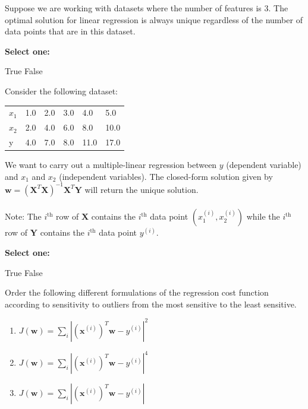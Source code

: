 \documentclass[11pt,addpoints,answers]{exam}
\numberwithin{equation}{section} %
\numberwithin{figure}{section} %
\numberwithin{table}{section} %
\newcommand{\wv}{\mathbf{w}}
\newcommand{\xv}{\mathbf{x}}
\newcommand{\Xv}{\mathbf{X}}
\newcommand{\Yv}{\mathbf{Y}}
\begin{document}
\begin{questions}
    
\question[2] Suppose we are working with datasets where the number of features is 3. The optimal solution for linear regression is always unique regardless of the number of data points that are in this dataset.
    
    \textbf{Select one:}
    \begin{checkboxes}
        \choice True
        \CorrectChoice False
    \end{checkboxes}
    
    
    \newpage
    \question[1] Consider the following dataset:
        \begin{table}[H]
    \centering
        \begin{tabular}{llllll}
        $x_1$ & 1.0 & 2.0 & 3.0 & 4.0 & 5.0 \\
        $x_2$ & 2.0 & 4.0 & 6.0 & 8.0 & 10.0 \\
        y & 4.0 & 7.0 & 8.0 & 11.0 & 17.0
        \end{tabular}
    \end{table}
   We want to carry out a multiple-linear regression between $y$ (dependent variable) and $x_1$ and $x_2$ (independent variables). The closed-form solution given by $\wv = \left(\Xv^T\Xv\right)^{-1}\Xv^T \Yv$ will return the unique solution. 
    \\~\\
    Note: The $i^{\text{th}}$ row of $\Xv$ contains the $i^{\text{th}}$ data point $(x_1^{(i)}, x_2^{(i)})$ while the $i^{\text{th}}$ row of $\Yv$ contains the $i^{\text{th}}$ data point $y^{(i)}$. 
    
        \textbf{Select one:}
    \begin{checkboxes}
        \CorrectChoice True
        \choice False
    \end{checkboxes}
    

    
    \question[3] Order the following different formulations of the regression cost function according to sensitivity to outliers from the most sensitive to the least sensitive. 
\begin{enumerate}
    \item $J(\mathbf{w}) = \sum\limits_{i} | (\xv^{(i)})^T\mathbf{w}-y^{(i)}|^2$
    \item $J(\mathbf{w}) = \sum\limits_{i} | (\xv^{(i)})^T\mathbf{w}-y^{(i)}|^4$
    \item $J(\mathbf{w}) = \sum\limits_{i} | (\xv^{(i)})^T\mathbf{w}-y^{(i)}|$
\end{enumerate}


\end{questions}
\end{document}
